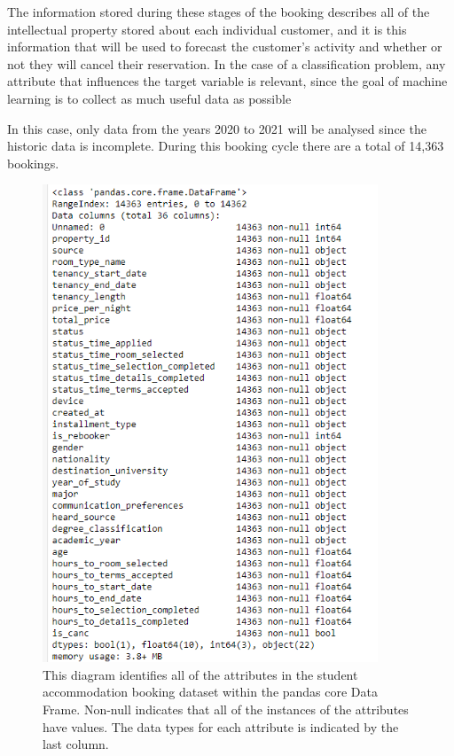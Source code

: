 \vspace{5mm}

The information stored during these stages of the booking describes all of the intellectual property stored about each individual customer, and it is this information that will be used to forecast the customer's activity and whether or not they will cancel their reservation. In the case of a classification problem, any attribute that influences the target variable is relevant, since the goal of machine learning is to collect as much useful data as possible

\vspace{5mm}

In this case, only data from the years 2020 to 2021 will be analysed since the historic data is incomplete. During this booking cycle there are a total of 14,363 bookings.

\begin{figure}[H]
 \centering
 \includegraphics[width=10cm]{figures/df_info.png}
 \caption{This diagram identifies all of the attributes in the student accommodation booking dataset within the pandas core Data Frame. Non-null indicates that all of the instances of the attributes have values. The data types for each attribute is indicated by the last column. }
\end{figure}

